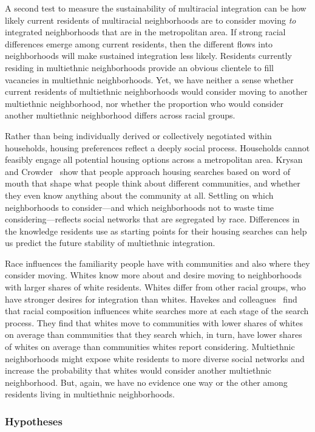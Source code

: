 \documentclass{baderart}
\renewcommand{\needcite}[1][]{%
	\strong{[CITE: %
		\ifthenelse{\equal{#1}{}}{}{: #1}	%
	]}}
\begin{document}
A second test to measure the sustainability of multiracial integration can be how likely current residents of multiracial neighborhoods are to consider moving \emph{to} integrated neighborhoods that are in the metropolitan area. If strong racial differences emerge among current residents, then the different flows into neighborhoods will make sustained integration less likely. Residents currently residing in multiethnic neighborhoods provide an obvious clientele to fill vacancies in multiethnic neighborhoods. Yet, we have neither a sense whether current residents of multiethnic neighborhoods would consider moving to another multiethnic neighborhood, nor whether the proportion who would consider another multiethnic neighborhood differs across racial groups.

Rather than being individually derived or collectively negotiated within households, housing preferences reflect a deeply social process. Households cannot feasibly engage all potential housing options across a metropolitan area. Krysan and Crowder\needcite\ show that people approach housing searches based on word of mouth that shape what people think about different communities, and whether they even know anything about the community at all. Settling on which neighborhoods to consider---and which neighborhoods not to waste time considering---reflects social networks that are segregated by race. Differences in the knowledge residents use as starting points for their housing searches can help us predict the future stability of multiethnic integration.

Race influences the familiarity people have with communities and also where they consider moving. Whites know more about and desire moving to neighborhoods with larger shares of white residents. Whites differ from other racial groups, who have stronger desires for integration than whites. Havekes and colleagues\needcite\ find that racial composition influences white searches more at each stage of the search process. They find that whites move to communities with lower shares of whites on average than communities that they search which, in turn, have lower shares of whites on average than communities whites report considering. Multiethnic neighborhoods might expose white residents to more diverse social networks and increase the probability that whites would consider another multiethnic neighborhood. But, again, we have no evidence one way or the other among residents living in multiethnic neighborhoods.

\subsubsection{Hypotheses}\label{hypotheses}
\end{document}
